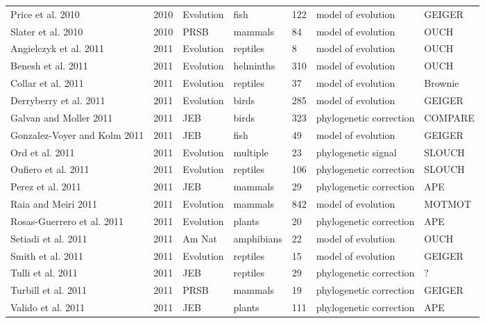 \begin{landscape}
\begin{center}
\begin{longtable}{p{6cm}llllll}
Price et al. 2010 &   2010    &   Evolution   &   fish    &   122 &   model of evolution  &   GEIGER  \\
Slater et al. 2010    &   2010    &   PRSB    &   mammals &   84  &   model of evolution  &   OUCH    \\
Angielczyk et al. 2011    &   2011    &   Evolution   &   reptiles    &   8   &   model of evolution  &   OUCH    \\
Benesh et al. 2011    &   2011    &   Evolution   &   helminths   &   310 &   model of evolution  &   OUCH    \\
Collar et al. 2011    &   2011    &   Evolution   &   reptiles    &   37  &   model of evolution  &   Brownie \\
Derryberry et al. 2011    &   2011    &   Evolution   &   birds   &   285 &   model of evolution  &   GEIGER  \\
Galvan and Moller 2011    &   2011    &   JEB &   birds   &   323 &   phylogenetic correction &   COMPARE \\
Gonzalez-Voyer and Kolm 2011  &   2011    &   JEB &   fish    &   49  &   model of evolution  &   GEIGER  \\
Ord et al. 2011   &   2011    &   Evolution   &   multiple    &   23  &   phylogenetic signal &   SLOUCH  \\
Oufiero et al. 2011   &   2011    &   Evolution   &   reptiles    &   106 &   phylogenetic correction &   SLOUCH  \\
Perez et al. 2011 &   2011    &   JEB &   mammals &   29  &   phylogenetic correction &   APE \\
Raia and Meiri 2011   &   2011    &   Evolution   &   mammals &   842 &   model of evolution  &   MOTMOT  \\
Rosas-Guerrero et al. 2011    &   2011    &   Evolution   &   plants  &   20  &   phylogenetic correction &   APE \\
Setiadi et al. 2011   &   2011    &   Am Nat  &   amphibians  &   22  &   model of evolution  &   OUCH    \\
Smith et al. 2011 &   2011    &   Evolution   &   reptiles    &   15  &   model of evolution  &   GEIGER  \\
Tulli et al. 2011 &   2011    &   JEB &   reptiles    &   29  &   phylogenetic correction &   ?   \\
Turbill et al. 2011   &   2011    &   PRSB    &   mammals &   19  &   phylogenetic correction &   GEIGER  \\
Valido et al. 2011    &   2011    &   JEB &   plants  &   111 &   phylogenetic correction &   APE \\

\end{longtable}
\end{center}
\end{landscape}
